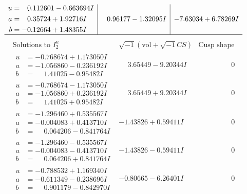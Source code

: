 \documentclass[1p]{elsarticle_modified}
\theoremstyle{definition}
\newcommand{\I}{\sqrt{-1}}
\begin{document}
$$\begin{array}{c|c|c}
\begin{aligned}
u &= \phantom{-}0.112601 - 0.663694 I \\
a &= \phantom{-}0.35724 + 1.92716 I \\
b &= -0.12664 + 1.48355 I\end{aligned}
 & \phantom{-}0.96177 - 1.32095 I & -7.63034 + 6.78269 I\\
 \hline 
 \end{array}$$\newpage$$\begin{array}{c|c|c}  
\text{Solutions to }I^u_{2}& \I (\text{vol} + \sqrt{-1}CS) & \text{Cusp shape}\\
 \hline 
\begin{aligned}
u &= -0.768674 + 1.173050 I \\
a &= -1.056860 - 0.236192 I \\
b &= \phantom{-}1.41025 - 0.95482 I\end{aligned}
 & \phantom{-}3.65449 - 9.20344 I & \phantom{-0.000000 } 0 \\ \hline\begin{aligned}
u &= -0.768674 - 1.173050 I \\
a &= -1.056860 + 0.236192 I \\
b &= \phantom{-}1.41025 + 0.95482 I\end{aligned}
 & \phantom{-}3.65449 + 9.20344 I & \phantom{-0.000000 } 0 \\ \hline\begin{aligned}
u &= -1.296460 + 0.535567 I \\
a &= -0.004083 + 0.413710 I \\
b &= \phantom{-}0.064206 - 0.841764 I\end{aligned}
 & -1.43826 + 0.59411 I & \phantom{-0.000000 } 0 \\ \hline\begin{aligned}
u &= -1.296460 - 0.535567 I \\
a &= -0.004083 - 0.413710 I \\
b &= \phantom{-}0.064206 + 0.841764 I\end{aligned}
 & -1.43826 - 0.59411 I & \phantom{-0.000000 } 0 \\ \hline\begin{aligned}
u &= -0.788532 + 1.169340 I \\
a &= -0.611349 - 0.238696 I \\
b &= \phantom{-}0.901179 - 0.842970 I\end{aligned}
 & -0.80665 - 6.26401 I & \phantom{-0.000000 } 0 \\ \hline\begin{aligned}

\end{aligned}
\end{array}$$
\end{document}

